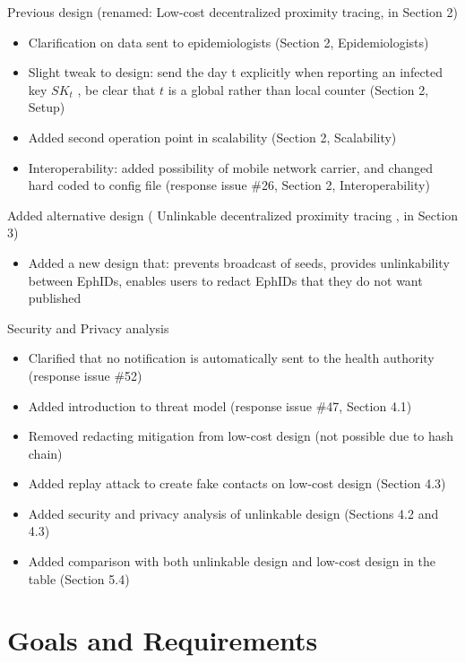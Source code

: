 \documentclass[10.8pt,a4paper]{article}
\begin{document}
Previous design (renamed:   Low-cost decentralized proximity tracing,  in Section 2)

\begin{itemize}
\item Clarification on data sent to epidemiologists (Section 2, Epidemiologists)
\item Slight tweak to design: send the day  t  explicitly when reporting an infected key
$SK_t$  , be clear that $ t$  is a global rather than local counter (Section 2, Setup) 
\item Added second operation point in scalability (Section 2, Scalability)
\item Interoperability: added possibility of mobile network carrier, and changed hard
coded to config file (response issue \#26, Section 2, Interoperability)
\end{itemize}

Added alternative design  ( Unlinkable decentralized proximity tracing , in Section 3)

\begin{itemize}
\item Added a new design that: prevents broadcast of seeds, provides unlinkability between EphIDs, enables users to redact EphIDs that they do not want published
\end{itemize}

Security and Privacy analysis
\begin{itemize}
\item Clarified that no notification is automatically sent to the health authority (response
issue \#52)
\item Added introduction to threat model (response issue \#47, Section 4.1)
\item Removed redacting mitigation from low-cost design (not possible due to hash
chain)
\item Added replay attack to create fake contacts on low-cost design (Section 4.3)
\item Added security and privacy analysis of unlinkable design (Sections 4.2 and 4.3)
\item Added comparison with both unlinkable design and low-cost design in the table
(Section 5.4)
\end{itemize}

\section{Goals and Requirements}
\end{document}
